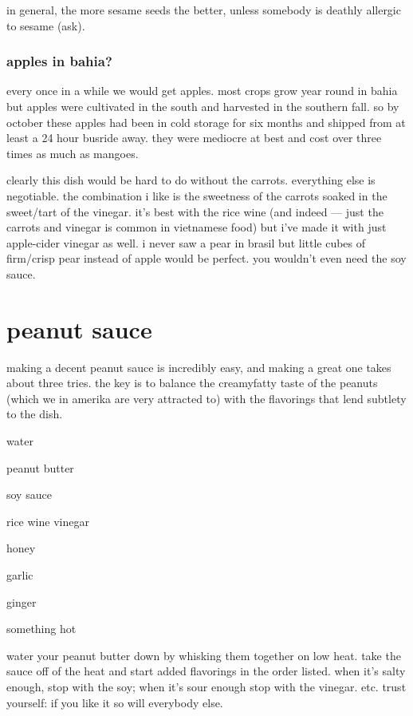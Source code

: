 in general, the more sesame seeds the better, unless somebody is deathly 
allergic to sesame (ask).

\subsubsection{apples in bahia?}

every once in a while we would get apples. most crops grow year round in bahia 
but apples were cultivated in the south and harvested in the southern fall. so 
by october these apples had been in cold storage for six months and shipped 
from at least a 24 hour busride away. they were mediocre at best and cost over 
three times as much as mangoes.

clearly this dish would be hard to do without the carrots. everything else is 
negotiable. the combination i like is the sweetness of the carrots soaked in 
the sweet/tart of the vinegar. it's best with the rice wine (and indeed --- 
just the carrots and vinegar is common in vietnamese food) but i've made it 
with just apple-cider vinegar as well. i never saw a pear in brasil but little 
cubes of firm/crisp pear instead of apple would be perfect. you wouldn't even 
need the soy sauce.

\section{peanut sauce}

making a decent peanut sauce is incredibly easy, and making a great one takes 
about three tries. the key is to balance the creamyfatty taste of the peanuts 
(which we in amerika are very attracted to) with the flavorings that lend 
subtlety to the dish.

\begin{ingredients}
  \item water
  \item peanut butter
  \item soy sauce
  \item rice wine vinegar
  \item honey
  \item garlic
  \item ginger
  \item something hot
\end{ingredients}

water your peanut butter down by whisking them together on low heat. take the 
sauce off of the heat and start added flavorings in the order listed. when 
it's salty enough, stop with the soy; when it's sour enough stop with the 
vinegar. etc. trust yourself: if you like it so will everybody else.

